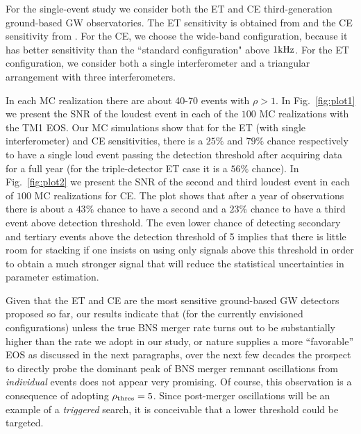 \documentclass[prd,aps,floatfix,superscriptaddress,nofootinbib,twocolumn,10pt,English]{revtex4-1}
\begin{document}
For the single-event study we consider both the ET and CE
third-generation ground-based GW observatories.  The ET sensitivity is
obtained from \cite{amaro2009einstein} and the CE sensitivity from
\cite{abbott2017exploring}. For the CE, we choose the wide-band
configuration, because it has better sensitivity than the ``standard
configuration" above $1 {\rm kHz}$. For the ET configuration, we
consider both a single interferometer and a triangular arrangement
with three interferometers.

 In each MC realization there are about
40-70 events with $\rho >1$.  In Fig.~\ref{fig:plot1} we present the
SNR of the loudest event in each of the $100$ MC realizations with the
TM1 EOS. Our MC simulations show that for the ET (with single
interferometer) and CE sensitivities, there is a $25\%$ and $79\%$
chance respectively to have a single loud event passing the detection
threshold after acquiring data for a full year (for the
triple-detector ET case it is a $56 \%$ chance). In
Fig.~\ref{fig:plot2} we present the SNR of the second and third
loudest event in each of $100$ MC realizations for CE. The plot shows
that after a year of observations there is about a $43\%$ chance to
have a second and a $23\%$ chance to have a third event above
detection threshold.  The even lower chance of detecting secondary and
tertiary events above the detection threshold of 5 implies that there
is little room for stacking if one insists on using only signals above
this threshold in order to obtain a much stronger signal that will
reduce the statistical uncertainties in parameter estimation.
 
Given that the ET and CE are the most sensitive ground-based GW
detectors proposed so far, our results indicate that (for the
currently envisioned configurations) unless the true BNS merger rate
turns out to be substantially higher than the rate we adopt in our
study, or nature supplies a more ``favorable'' EOS as discussed in the next paragraphs,
over the next few decades the prospect to directly probe the
dominant peak of BNS merger remnant oscillations from {\em individual}
events does not appear very promising. Of course, this observation is a
consequence of adopting $\rho_{\rm thres}=5$. Since post-merger
oscillations will be an example of a {\em triggered} search, it is
conceivable that a lower threshold could be targeted. 
\end{document}
